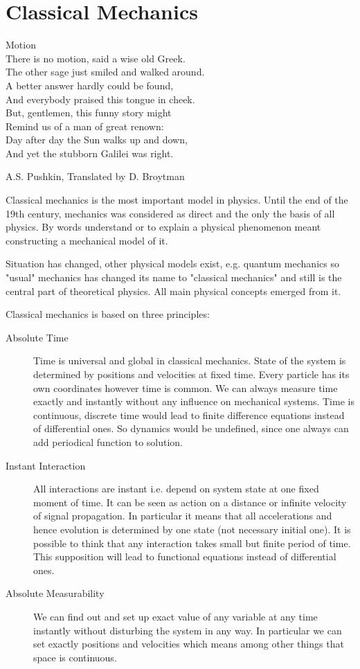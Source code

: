 \chapter{Classical Mechanics}
\label{ch:cm}
{
\setlength{}
\epigraph {
    Motion\\
There is no motion, said a wise old Greek.\\
The other sage just smiled and walked around.\\
A better answer hardly could be found,\\
And everybody praised this tongue in cheek.\\
But, gentlemen, this funny story might\\
Remind us of a man of great renown:\\
Day after day the Sun walks up and down,\\
And yet the stubborn Galilei was right.
} {A.S. Pushkin, Translated by D. Broytman }
}

Classical mechanics  is the most important model in physics. Until the end of
the 19th century, mechanics was considered as direct and the only the basis of
all physics. By words understand or to explain a physical phenomenon meant
constructing a mechanical model of it.

Situation has changed,  other physical models exist, e.g. quantum mechanics so 
"usual" mechanics has changed its name to "classical mechanics" and still is
the central part of theoretical physics. All main physical concepts emerged from
it.

Classical mechanics is based on three principles:
\begin{description}
  \item[ Absolute Time] 
    Time is universal and global in classical mechanics. State of the system is
    determined by positions and velocities at fixed time. Every particle
    has its own coordinates however time is common. We can always measure
    time  exactly and instantly without any influence on mechanical
    systems. Time is continuous, discrete time would lead to finite
    difference equations instead of differential ones. So dynamics would be
    undefined, since one always can add periodical function to solution.
\item [Instant Interaction] All interactions are instant i.e. depend on system
    state at one fixed moment of time. It can be seen as action on a distance
        or infinite velocity of signal propagation. In particular it means that
        all accelerations and hence evolution is determined by one state (not
        necessary initial one). It is possible to think that any interaction
        takes small but finite period of time. This supposition will lead to
        functional equations instead of differential ones.
  \item [ Absolute Measurability]
    We can find out and set up exact value of any variable at any time
    instantly without disturbing the system in any way. In particular we
    can set exactly positions and velocities which means among other things
    that space is continuous.
\end{description}

